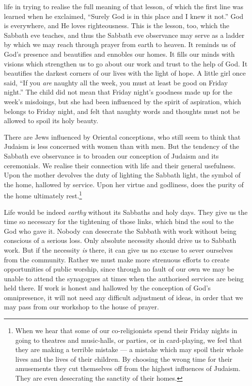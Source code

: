 life in trying to realise the full meaning of
that lesson, of which the first line was learned
when he exclaimed, “Surely God is in this
place and I knew it not.” God is everywhere,
and He loves righteousness. This
is the lesson, too, which the Sabbath eve
teaches, and thus the Sabbath eve observance
may serve as a ladder by which
we may reach through prayer from earth
to heaven. It reminds us of God’s presence
and beautifies and ennobles our homes.
It fills our minds with visions which
strengthen us to go about our work and
trust to the help of God. It beautifies
the darkest corners of our lives with the
light of hope. A little girl once said,
“If you \textsl{are} naughty all the week, you
must at least be good on Friday night.”
The child did not mean that Friday night’s
goodness made up for the week’s misdoings,
but she had been influenced by the spirit
of aspiration, which belongs to Friday night,
and felt that naughty words and thoughts
must not be allowed to spoil its holy
beauty.

There are Jews influenced by Oriental
conceptions, who still seem to think that
Judaism is less concerned with women than
with men. But the tendency of the Sabbath
eve observance is to broaden our conception
of Judaism and its ceremonials. We
realise their connection with life and their
general usefulness. Upon the mother
devolves the duty of lighting the Sabbath
light, the symbol of the home, hallowed
by service. Upon her virtue and godliness,
does the purity of the home ultimately
rest.\footnote{When we hear that some of our co-religionists spend
their Friday nights in going to theatres and music-halls, or
parties, or in card-playing, we feel that they are making a
terrible mistake — a mistake which may spoil their whole lives
and the lives of their children. By choosing the wrong time
for their amusements they cut themselves off from the
highest influences of Judaism. They are even desecrating
the sanctity of their homes.}

Life would be indeed \textsl{earthy} without its
Sabbaths and holy days. They give us the
time so necessary for the tightening of those
links, which bind the soul to the God who
gave it. Nobody can desecrate the Sabbath
with work without being conscious of a
serious loss. Only absolute necessity should
drive us to Sabbath work. But if the
necessity \textsl{is} there, it can give us no excuse
to sever ourselves from the community.
Rather we must make more strenuous efforts
to create opportunities of public worship,
since through no fault of our own we
may be unable to attend the synagogues
at times when the authorised services are
being held there. If work is honest and
hallowed by the conception of God’s
omnipresence, it will not need any difficult
adjustment of ideas, in order that we
may pass from our workshop to the house
of prayer.

